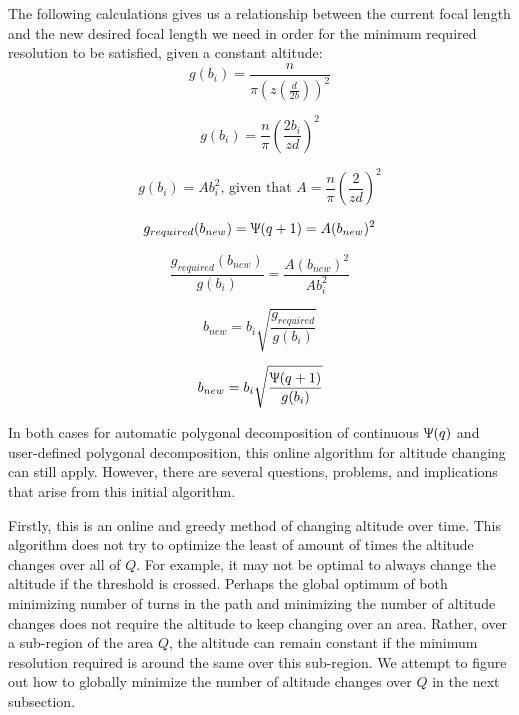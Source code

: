 \documentclass[conference]{IEEEtran}
\theoremstyle{plain}%
\begin{document}
The following calculations gives us a relationship between the current focal length and the new desired focal length we need in order for the minimum required resolution to be satisfied, given a constant altitude:
\begin{equation}
g(b_i) = \frac{n}{\pi \left( z \left( \frac{d}{2b} \right) \right)^2}
\end{equation}

\begin{equation}
g(b_i) = \frac{n}{\pi} \left( \frac{2b_i}{zd} \right)^2
\end{equation}

\begin{equation} \label{eq:resolution_A}
g(b_i)=Ab_i^2 \text{, given that } A=\frac{n}{\pi} \left( \frac{2}{zd} \right)^2
\end{equation}

\begin{equation}
g_{required}(b_{new})=\Uppsi(q+1)=A(b_{new})^2
\end{equation}

\begin{equation}
\frac{g_{required}(b_{new})}{g(b_i)} = \frac{A(b_{new})^2}{Ab_i^2}
\end{equation}

\begin{equation}
b_{new} = b_i \sqrt{\frac{g_{required}}{g(b_i)}}
\end{equation}

\begin{equation} \label{eq:b_new}
b_{new} = b_i \sqrt{\frac{\Uppsi(q+1)}{g(b_i)}}
\end{equation}

In both cases for automatic polygonal decomposition of continuous $\Uppsi(q)$ and user-defined polygonal decomposition, this online algorithm for altitude changing can still apply. However, there are several questions, problems, and implications that arise from this initial algorithm. 

Firstly, this is an online and greedy method of changing altitude over time. This algorithm does not try to optimize the least of amount of times the altitude changes over all of $Q$. For example, it may not be optimal to always change the altitude if the threshold is crossed. Perhaps the global optimum of both minimizing number of turns in the path and minimizing the number of altitude changes does not require the altitude to keep changing over an area. Rather, over a sub-region of the area $Q$, the altitude can remain constant if the minimum resolution required is around the same over this sub-region. We attempt to figure out how to globally minimize the number of altitude changes over $Q$ in the next subsection.
\end{document}
